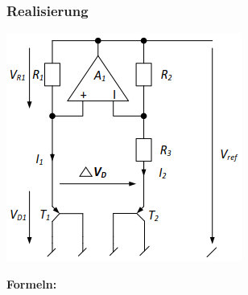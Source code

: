 \subsubsection{Realisierung}
\begin{minipage}[c]{0.5\textwidth}
	\includegraphics[width=1\linewidth]{chapters/Spannungsref/images/realisierung}
\end{minipage}
\begin{minipage}[c]{0.5\textwidth}
	\textbf{Formeln:}\\
	
\end{minipage}